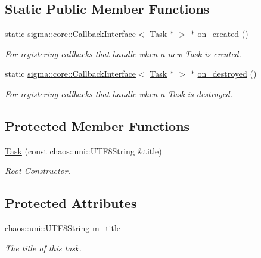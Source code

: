 \subsection*{Static Public Member Functions}
\begin{DoxyCompactItemize}
\item 
static \hyperlink{classsigma_1_1core_1_1_callback_interface}{sigma\+::core\+::\+Callback\+Interface}$<$ \hyperlink{classsigma_1_1core_1_1tasks_1_1_task}{Task} $\ast$ $>$ $\ast$ \hyperlink{classsigma_1_1core_1_1tasks_1_1_task_ab5adda36bbe6b20916f582ffeb311a13}{on\+\_\+created} ()
\begin{DoxyCompactList}\small\item\em For registering callbacks that handle when a new \hyperlink{classsigma_1_1core_1_1tasks_1_1_task}{Task} is created. \end{DoxyCompactList}\item 
static \hyperlink{classsigma_1_1core_1_1_callback_interface}{sigma\+::core\+::\+Callback\+Interface}$<$ \hyperlink{classsigma_1_1core_1_1tasks_1_1_task}{Task} $\ast$ $>$ $\ast$ \hyperlink{classsigma_1_1core_1_1tasks_1_1_task_a720571d12a0e2b41c918f448f5fc81db}{on\+\_\+destroyed} ()
\begin{DoxyCompactList}\small\item\em For registering callbacks that handle when a \hyperlink{classsigma_1_1core_1_1tasks_1_1_task}{Task} is destroyed. \end{DoxyCompactList}\end{DoxyCompactItemize}
\subsection*{Protected Member Functions}
\begin{DoxyCompactItemize}
\item 
\hyperlink{classsigma_1_1core_1_1tasks_1_1_task_a22316f108f9eeea2d2497b825b068c84}{Task} (const chaos\+::uni\+::\+U\+T\+F8\+String \&title)
\begin{DoxyCompactList}\small\item\em Root Constructor. \end{DoxyCompactList}\end{DoxyCompactItemize}
\subsection*{Protected Attributes}
\begin{DoxyCompactItemize}
\item 
\hypertarget{classsigma_1_1core_1_1tasks_1_1_task_a049db1297dbeb6efca7ec90cc3a7a74f}{}chaos\+::uni\+::\+U\+T\+F8\+String \hyperlink{classsigma_1_1core_1_1tasks_1_1_task_a049db1297dbeb6efca7ec90cc3a7a74f}{m\+\_\+title}\label{classsigma_1_1core_1_1tasks_1_1_task_a049db1297dbeb6efca7ec90cc3a7a74f}

\begin{DoxyCompactList}\small\item\em The title of this task. \end{DoxyCompactList}\end{DoxyCompactItemize}


